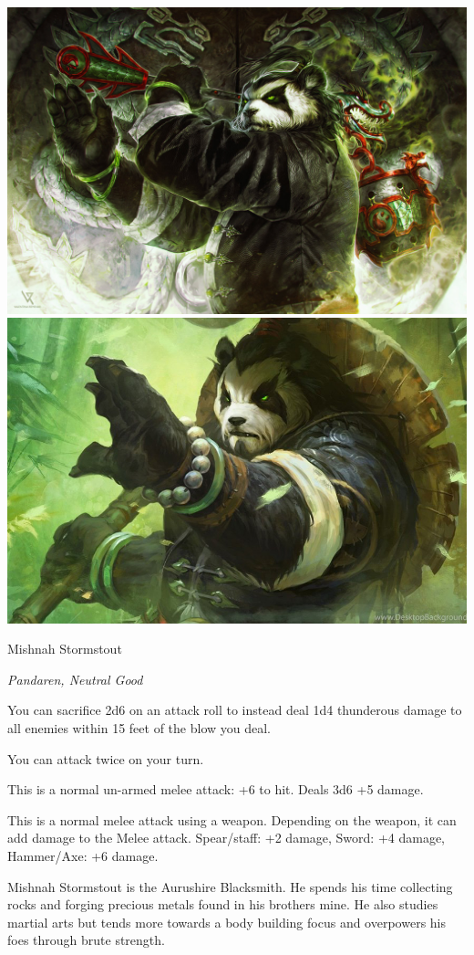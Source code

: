 \begin{center}
	\includegraphics[width=0.48\linewidth]{img/WoW/mishnah.jpg} 		\includegraphics[width=0.48\linewidth]{img/WoW/mishna.jpg}
\end{center}

\begin{monsterbox}{Mishnah Stormstout}
	\begin{hangingpar}
		\textit{Pandaren, Neutral Good}
	\end{hangingpar}
	\dndline%
	\basics[%
	armorclass = 17,
	hitpoints  = 172,
	speed      = 30 ft
	]
	\dndline%
	\stats[
	STR = \stat{20}, %
	DEX = \stat{18},
	CON = \stat{18},
	INT = \stat{12},
	WIS = \stat{16},
	CHA = \stat{18}
	]
	\dndline%
	\details[%
	languages = {Common, Elvish, Dwarvish, Gnomish, Halfling, Orc, Pandaren},
	challenge = 10
	]
	\dndline%
	\begin{monsteraction}
		You can sacrifice 2d6 on an attack roll to instead deal 1d4 thunderous damage to all enemies within 15 feet of the blow you deal.
	\end{monsteraction}	
	\begin{monsteraction}
		You can attack twice on your turn.
	\end{monsteraction}
	\begin{monsteraction}[Melee]
		This is a normal un-armed melee attack: +6 to hit. Deals 3d6 +5 damage.
	\end{monsteraction}
	\begin{monsteraction}
		This is a normal melee attack using a weapon. Depending on the weapon, it can add damage to the Melee attack. Spear/staff: +2 damage, Sword: +4 damage, Hammer/Axe: +6 damage.
	\end{monsteraction}
	Mishnah Stormstout is the Aurushire Blacksmith. He spends his time collecting rocks and forging precious metals found in his brothers mine. He also studies martial arts but tends more towards a body building focus and overpowers his foes through brute strength.
\end{monsterbox}

